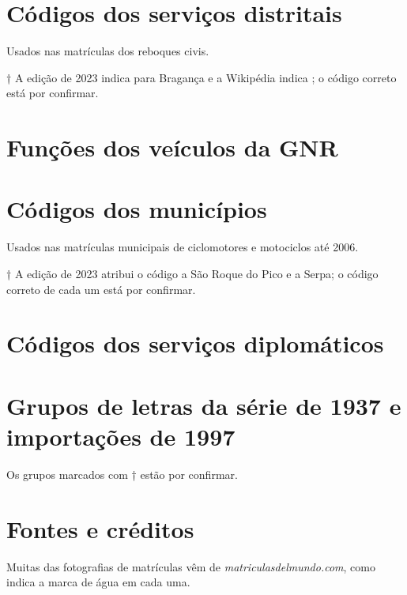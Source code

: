 \section{Códigos dos serviços distritais}\label{sec:distritos}
Usados nas matrículas dos reboques civis.


{\small † A edição de 2023 indica  para Bragança e a Wikipédia indica
; o código correto está por confirmar.}

\section{Funções dos veículos da GNR}\label{sec:gnr}


\section{Códigos dos municípios}\label{sec:municipios}
Usados nas matrículas municipais de ciclomotores e motociclos até 2006.


{\small † A edição de 2023 atribui o código  a São Roque do
Pico e a Serpa; o código correto de cada um está por confirmar.}

\section{Códigos dos serviços diplomáticos}\label{sec:codigos-diplomaticos}


\section{Grupos de letras da série de 1937 e importações de 1997}\label{sec:grupos}
Os grupos marcados com † estão por confirmar.


\section{Fontes e créditos}

Muitas das fotografias de matrículas vêm de \emph{matriculasdelmundo.com}, como
indica a marca de água em cada uma.

